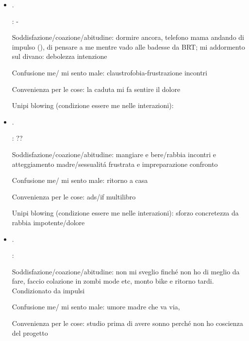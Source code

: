 \begin{itemize}
Convenienza per le cose:  o rabbia angoscia (), astrazione artistica dei 5 libri: la fatica di pensare \'e uno scoglio insormontabile

Unipi blowing (condizione essere me nelle interazioni):

\item {}.

: -

Soddisfazione/coazione/abitudine: dormire ancora, telefono mama andando di impulso (),  di pensare a me mentre vado alle badesse da BRT; mi addormento sul divano: debolezza intenzione

Confusione me/ mi sento male: claustrofobia-frustrazione incontri

Convenienza per le cose: la caduta mi fa sentire il dolore 

Unipi blowing (condizione essere me nelle interazioni):

\item {}.

: ??

Soddisfazione/coazione/abitudine: mangiare e bere/rabbia incontri e atteggiamento madre/sessualit\'a frustrata e impreparazione confronto 

Confusione me/ mi sento male: ritorno a casa 

Convenienza per le cose: ads/if multilibro

Unipi blowing (condizione essere me nelle interazioni): sforzo concretezza da rabbia impotente/dolore

\item {}.

: 

Soddisfazione/coazione/abitudine: non mi sveglio finch\'e non ho di meglio da fare, faccio colazione in zombi mode etc, monto bike e ritorno tardi. Condizionato da impulsi

Confusione me/ mi sento male: umore madre che va via, 

Convenienza per le cose: studio prima di avere sonno perch\'e non ho coscienza del progetto


\end{itemize}
